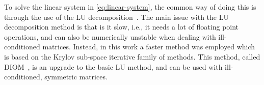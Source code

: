 To solve the linear system in \autoref{eq:linear-system}, the common way of doing this is 
through the use of the LU decomposition~\cite{trefethenNumericalLinearAlgebra1997}. The 
main issue with the LU decomposition method is that is it slow, i.e., it needs a lot of 
floating point operations, and can also be numerically unstable when dealing with 
ill-conditioned matrices. Instead, in this work a faster method was employed which is based 
on the Krylov sub-space iterative family of methods. This method, called 
DIOM~\cite{saadPracticalUseKrylov1984a}, is an upgrade to the basic LU method, and can be 
used with ill-conditioned, symmetric matrices.